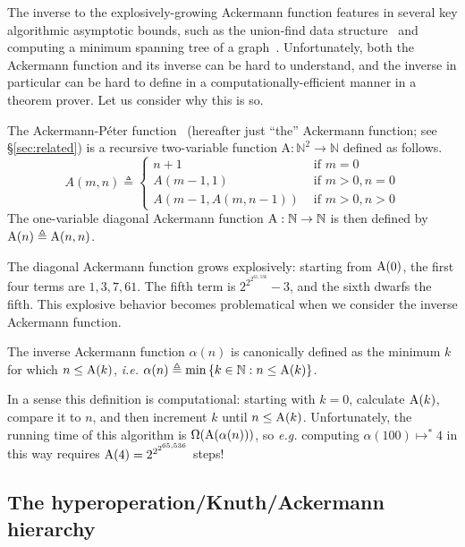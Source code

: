 The inverse to the
explosively-growing Ackermann function features in several key algorithmic asymptotic
bounds, such as the union-find data structure~\cite{tarjan} and computing a minimum spanning
tree of a graph~\cite{chazelle}.  Unfortunately, both the Ackermann function and its inverse
can be hard to understand, and the inverse in particular can be hard to define in a computationally-efficient manner in a theorem prover.  Let us consider why this
is so.
\begin{defn} \label{defn: ack}
The Ackermann-P\'eter function~\cite{blah} (hereafter just ``the'' Ackermann function; see \S\ref{sec:related}) is a recursive two-variable function $\text{A} : \mathbb{N}^2 \to \mathbb{N}$ defined as follows.
\begin{equation*}
A(m, n) \triangleq \begin{cases}
n + 1 & \text{ if } m = 0 \\
A(m-1, 1) & \text{ if } m > 0, n = 0 \\
A(m-1, A(m, n-1)) & \text{ if } m > 0, n > 0
\end{cases}
\end{equation*}
The one-variable diagonal Ackermann function $\text{A} : \mathbb{N} \to \mathbb{N}$ is then defined by $\text{A}(n) \triangleq \text{A}(n, n)$.	
\end{defn}

The diagonal Ackermann function grows explosively: starting from $\text{A}(0)$, the first four terms are $1, 3, 7, 61$.  The fifth term is $2^{2^{2^{65,536}}}-3$, and the sixth dwarfs the fifth.
This explosive behavior becomes problematical when we consider
the inverse Ackermann function\cite{blah}.
\begin{defn} \label{defn: inv_ack}
The inverse Ackermann function $\alpha(n)$ is canonically defined as the minimum $k$ for which $n \le \text{A}(k)$, \emph{i.e.} $\alpha(n) \triangleq \min\left\{k\in \mathbb{N} : n \le \text{A}(k)\right\}$.
\end{defn}
In a sense this definition is computational: starting with $k=0$, calculate $\text{A}(k)$, compare
it to $n$, and then increment $k$ until $n \le \text{A}(k)$.
Unfortunately, the running time of this algorithm is $\Omega(\text{A}(\alpha(n)))$,
so \emph{e.g.} computing $\alpha(100) \mapsto^{*} 4$ in this way requires
$\text{A}(4) = 2^{2^{2^{65,536}}}$ steps!

\subsection{The hyperoperation/Knuth/Ackermann hierarchy}

